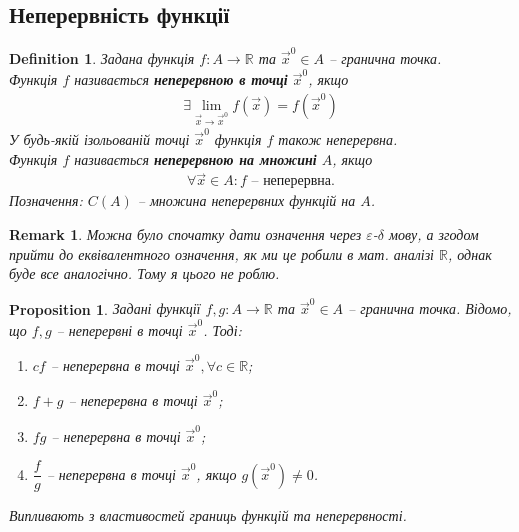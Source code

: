 \documentclass[a4paper, 10pt]{article}
\def\huge{\displaystyle}
\theoremstyle{theoremdd}
\theoremstyle{theoremdd}
\theoremstyle{theoremdd}
\newtheorem{definition}[theorem]{Definition}
\theoremstyle{theoremdd}
\theoremstyle{theoremdd}
\theoremstyle{theoremdd}
\newtheorem{proposition}[theorem]{Proposition}
\theoremstyle{theoremdd}
\newtheorem{remark}[theorem]{Remark}
\theoremstyle{theoremdd}
\theoremstyle{theoremdd}
\begin{document}
\subsection{Неперервність функції}
\begin{definition}
Задана функція $f \colon A \to \mathbb{R}$ та $\vec{x}^0 \in A$ -- гранична точка.\\
Функція $f$ називається \textbf{неперервною в точці} $\vec{x}^0$, якщо
\begin{align*}
\exists \huge \lim_{\vec{x} \to \vec{x}^0} f(\vec{x}) = f(\vec{x}^0)
\end{align*}
У будь-якій ізольованій точці $\vec{x}^0$ функція $f$ також неперервна.\\
Функція $f$ називається \textbf{неперервною на множині} $A$, якщо
\begin{align*}
\forall \vec{x} \in A: f \text{ -- неперервна.}
\end{align*}
Позначення: $C(A)$ -- множина неперервних функцій на $A$.
\end{definition}

\begin{remark}
Можна було спочатку дати означення через $\varepsilon$-$\delta$ мову, а згодом прийти до еквівалентного означення, як ми це робили в мат. аналізі $\mathbb{R}$, однак буде все аналогічно. Тому я цього не роблю.
\end{remark}

\begin{proposition}
\label{arithmetic_properties_of_continuity}
Задані функції $f,g \colon A \to \mathbb{R}$ та $\vec{x}^0 \in A$ -- гранична точка. Відомо, що $f,g$ -- неперервні в точці $\vec{x}^0$. Тоді:
\begin{enumerate}[nosep,wide=0pt,label={\arabic*)}]
\item $cf$ -- неперервна в точці $\vec{x}^0, \forall c \in \mathbb{R}$;
\item $f+g$ -- неперервна в точці $\vec{x}^0$;
\item $fg$ -- неперервна в точці $\vec{x}^0$;
\item $\dfrac{f}{g}$ -- неперервна в точці $\vec{x}^0$, якщо $g(\vec{x}^0) \neq 0$.
\end{enumerate}
\textit{Випливають з властивостей границь функцій та неперервності.}
\end{proposition}
\end{document}
